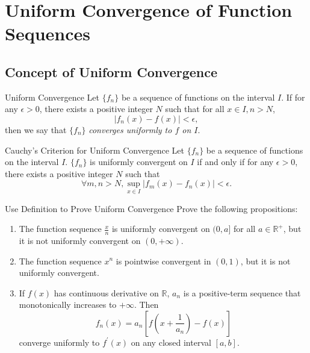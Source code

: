 
\section{Uniform Convergence of Function Sequences}

\subsection{Concept of Uniform Convergence}

\begin{definition}{Uniform Convergence}{}
  Let $\{f_n\}$ be a sequence of functions on the interval $I$.
  If for any $\epsilon > 0$, there exists a positive integer $N$
  such that for all $x \in I, n > N$,
  \begin{equation}
    |f_n(x) - f(x)| < \epsilon,
  \end{equation}
  then we say that $\{f_n\}$ \emph{converges uniformly to $f$ on $I$}.
\end{definition}

\begin{theorem}{Cauchy's Criterion for Uniform Convergence}{}
  Let $\{f_n\}$ be a sequence of functions on the interval $I$.
  $\{f_n\}$ is uniformly convergent on $I$ if and only if
  for any $\epsilon > 0$, there exists a positive integer $N$ such that
  \begin{equation}
    \forall m,n > N, \sup \limits_{x \in I} |f_m(x) - f_n(x)| < \epsilon.
  \end{equation}
\end{theorem}

\begin{example}{Use Definition to Prove Uniform Convergence}{}
  Prove the following propositions:
  \begin{enumerate}
  \item The function sequence $\frac{x}{n}$ is uniformly convergent on $(0, a]$
    for all $a \in \mathbb{R}^+$, but it is not uniformly convergent on $(0, +\infty)$.
  \item The function sequence $x^n$ is pointwise convergent in $(0, 1)$,
    but it is not uniformly convergent.
  \item If $f(x)$ has continuous derivative on $\mathbb{R}$, $a_n$ is a
    positive-term sequence that monotonically increases to $+\infty$.
    Then
    \begin{equation}
      f_n(x) = a_n \left[ f(x + \frac{1}{a_n}) - f(x) \right]
    \end{equation}
    converge uniformly to $f^{\prime}(x)$ on any closed interval $[a, b]$.
  \end{enumerate}
\end{example}

